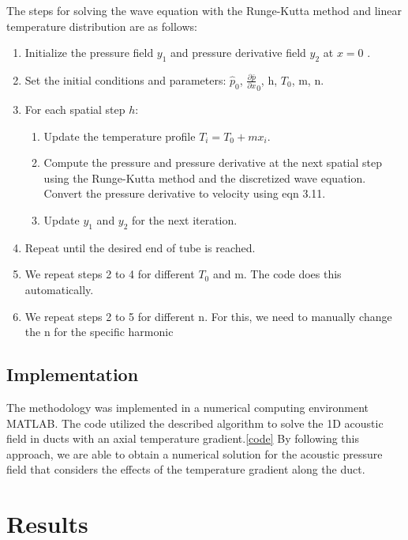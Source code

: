 \documentclass[8pt]{article} %
\begin{document}
The steps for solving the wave equation with the Runge-Kutta method and linear temperature distribution are as follows:

\begin{enumerate}
    \item Initialize the pressure field $y_1$ and pressure derivative field $y_2$  at $x = 0$ .
    \item Set the initial conditions and parameters: $\hat{p}_0$, $\frac{\partial \bar{p}}{\partial x}_0$, h, $T_0$, m, n.
    \item For each spatial step $h$:
        \begin{enumerate}
            \item Update the temperature profile $T_i = T_0 + m x_i$.
            \item Compute the pressure and pressure derivative at the next spatial step using the Runge-Kutta method and the discretized wave equation. Convert the pressure derivative to velocity using eqn 3.11.
            \item Update $y_1$ and $y_2$ for the next iteration.
        \end{enumerate}
    \item Repeat until the desired end of tube is reached.
    \item We repeat steps 2 to 4 for different $T_0$ and m. The code does this automatically.
    \item We repeat steps 2 to 5 for different n. For this, we need to manually change the n for the specific harmonic
\end{enumerate}

\subsection{Implementation}
The methodology was implemented in a numerical computing environment MATLAB. The code utilized the described algorithm to solve the 1D acoustic field in ducts with an axial temperature gradient.\ref{code}
By following this approach, we are able to obtain a numerical solution for the acoustic pressure field that considers the effects of the temperature gradient along the duct.

\section{Results}
\end{document}
